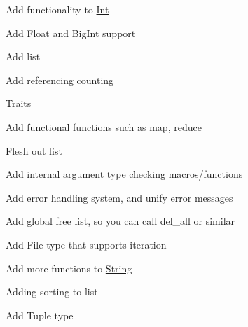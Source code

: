 \begin{DoxyItemize}
\item Add functionality to \mbox{\hyperlink{structInt}{Int}}
\item Add Float and Big\+Int support
\item Add list
\item Add referencing counting
\item Traits
\item Add functional functions such as map, reduce
\item Flesh out list
\item Add internal argument type checking macros/functions
\item Add error handling system, and unify error messages
\item Add global free list, so you can call {\ttfamily del\+\_\+all} or similar
\item Add File type that supports iteration
\item Add more functions to \mbox{\hyperlink{structString}{String}}
\item Adding sorting to list
\item Add Tuple type 
\end{DoxyItemize}